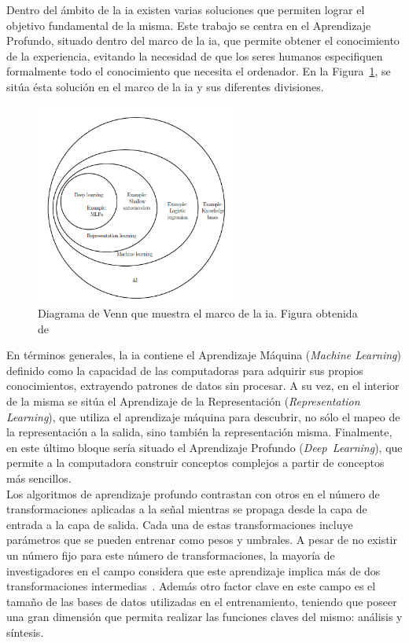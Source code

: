 Dentro del ámbito de la \acrshort{ia} existen varias soluciones que permiten lograr el objetivo fundamental de la misma. Este trabajo se centra en el Aprendizaje Profundo, situado dentro del marco de la \acrshort{ia}, que permite obtener el conocimiento de la experiencia, evitando la necesidad de que los seres humanos especifiquen formalmente todo el conocimiento que necesita el ordenador. En la Figura~\ref{fig.aprendizaje}, se sitúa ésta solución en el marco de la \acrshort{ia} y sus diferentes divisiones.

\begin{figure}[H]
	\begin{center}
		\includegraphics[width=0.6\textwidth]{figures/aprendizaje}
		\caption{Diagrama de Venn que muestra el marco de la \acrshort{ia}. Figura obtenida de~\cite{Goodfellow-et-al-2016}}
		\label{fig.aprendizaje}
	\end{center}
\end{figure}

En términos generales, la \acrshort{ia} contiene el Aprendizaje Máquina (\textit{Machine Learning}) definido como la capacidad de las computadoras para adquirir sus propios conocimientos, extrayendo patrones de datos sin procesar. A su vez, en el interior de la misma se sitúa el Aprendizaje de la Representación (\textit{Representation Learning}), que utiliza el aprendizaje máquina para descubrir, no sólo el mapeo de la representación a la salida, sino también la representación misma. Finalmente, en este último bloque sería situado el Aprendizaje Profundo (\textit{Deep~Learning}), que permite a la computadora construir conceptos complejos a partir de conceptos más sencillos.\\

Los algoritmos de aprendizaje profundo contrastan con otros en el número de transformaciones aplicadas a la señal mientras se propaga desde la capa de entrada a la capa de salida. Cada una de estas transformaciones incluye parámetros que se pueden entrenar como pesos y umbrales. A pesar de no existir un número fijo para este número de transformaciones, la mayoría de investigadores en el campo considera que este aprendizaje implica más de dos transformaciones intermedias~\cite{2014arXiv1404.7828S}. Además otro factor clave en este campo es el tamaño de las bases de datos utilizadas en el entrenamiento, teniendo que poseer una gran dimensión que permita realizar las funciones claves del mismo: análisis y síntesis.\\

